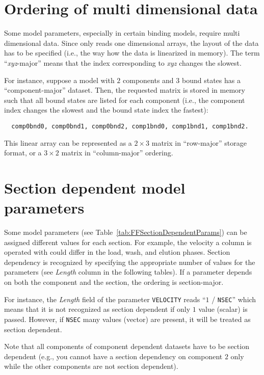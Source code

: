 \FloatBarrier
\section{Ordering of multi dimensional data}

Some model parameters, especially in certain binding models, require multi dimensional data.
Since \CADET{} only reads one dimensional arrays, the layout of the data has to be specified (i.e., the way how the data is linearized in memory).
The term ``\emph{xyz}-major'' means that the index corresponding to \emph{xyz} changes the slowest.

For instance, suppose a model with $2$ components and $3$ bound states has a ``component-major'' dataset.
Then, the requested matrix is stored in memory such that all bound states are listed for each component (i.e., the component index changes the slowest and the bound state index the fastest):
\begin{verbatim}
  comp0bnd0, comp0bnd1, comp0bnd2, comp1bnd0, comp1bnd1, comp1bnd2.
\end{verbatim}
This linear array can be represented as a $2 \times 3$ matrix in ``row-major'' storage format, or a $3 \times 2$ matrix in ``column-major'' ordering.

\section{Section dependent model parameters}

Some model parameters (see Table~\ref{tab:FFSectionDependentParams}) can be assigned different values for each section. For example, the velocity a column is operated with could differ in the load, wash, and elution phases.
Section dependency is recognized by specifying the appropriate number of values for the parameters (see \emph{Length} column in the following tables).
If a parameter depends on both the component and the section, the ordering is section-major.

For instance, the \emph{Length} field of the parameter \texttt{VELOCITY} reads ``$1$ / \texttt{NSEC}'' which means that it is not recognized as section dependent if only $1$ value (scalar) is passed.
However, if \texttt{NSEC} many values (vector) are present, it will be treated as section dependent.

Note that all components of component dependent datasets have to be section dependent (e.g., you cannot have a section dependency on component $2$ only while the other components are not section dependent).

